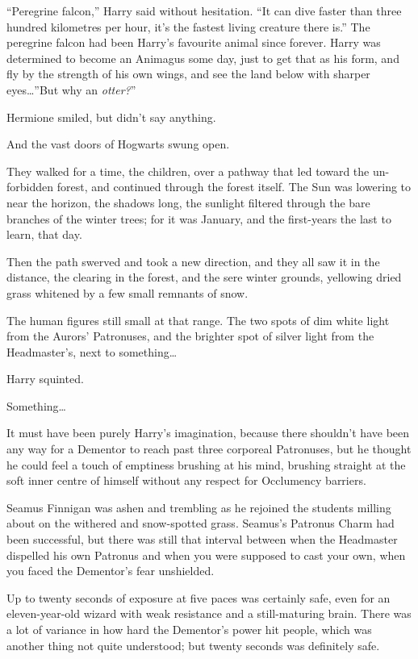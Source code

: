 “Peregrine falcon,” Harry said without hesitation. “It can dive faster than three hundred kilometres per hour, it’s the fastest living creature there is.” The peregrine falcon had been Harry’s favourite animal since forever. Harry was determined to become an Animagus some day, just to get that as his form, and fly by the strength of his own wings, and see the land below with sharper eyes…”But why an \emph{otter?}”

Hermione smiled, but didn’t say anything.

And the vast doors of Hogwarts swung open.

They walked for a time, the children, over a pathway that led toward the un-forbidden forest, and continued through the forest itself. The Sun was lowering to near the horizon, the shadows long, the sunlight filtered through the bare branches of the winter trees; for it was January, and the first-years the last to learn, that day.

Then the path swerved and took a new direction, and they all saw it in the distance, the clearing in the forest, and the sere winter grounds, yellowing dried grass whitened by a few small remnants of snow.

The human figures still small at that range. The two spots of dim white light from the Aurors’ Patronuses, and the brighter spot of silver light from the Headmaster’s, next to something…

Harry squinted.

Something…

It must have been purely Harry’s imagination, because there shouldn’t have been any way for a Dementor to reach past three corporeal Patronuses, but he thought he could feel a touch of emptiness brushing at his mind, brushing straight at the soft inner centre of himself without any respect for Occlumency barriers.

\later

Seamus Finnigan was ashen and trembling as he rejoined the students milling about on the withered and snow-spotted grass. Seamus’s Patronus Charm had been successful, but there was still that interval between when the Headmaster dispelled his own Patronus and when you were supposed to cast your own, when you faced the Dementor’s fear unshielded.

Up to twenty seconds of exposure at five paces was certainly safe, even for an eleven-year-old wizard with weak resistance and a still-maturing brain. There was a lot of variance in how hard the Dementor’s power hit people, which was another thing not quite understood; but twenty seconds was definitely safe.


